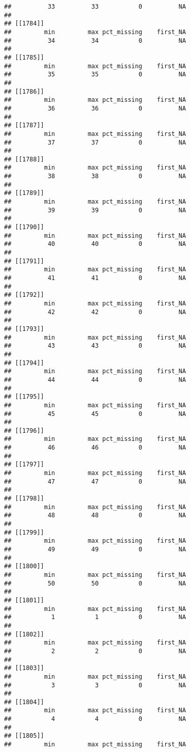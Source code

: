 \documentclass[
]{article}
\begin{document}
\begin{verbatim}
##          33          33           0          NA 
## 
## [[1784]]
##         min         max pct_missing    first_NA 
##          34          34           0          NA 
## 
## [[1785]]
##         min         max pct_missing    first_NA 
##          35          35           0          NA 
## 
## [[1786]]
##         min         max pct_missing    first_NA 
##          36          36           0          NA 
## 
## [[1787]]
##         min         max pct_missing    first_NA 
##          37          37           0          NA 
## 
## [[1788]]
##         min         max pct_missing    first_NA 
##          38          38           0          NA 
## 
## [[1789]]
##         min         max pct_missing    first_NA 
##          39          39           0          NA 
## 
## [[1790]]
##         min         max pct_missing    first_NA 
##          40          40           0          NA 
## 
## [[1791]]
##         min         max pct_missing    first_NA 
##          41          41           0          NA 
## 
## [[1792]]
##         min         max pct_missing    first_NA 
##          42          42           0          NA 
## 
## [[1793]]
##         min         max pct_missing    first_NA 
##          43          43           0          NA 
## 
## [[1794]]
##         min         max pct_missing    first_NA 
##          44          44           0          NA 
## 
## [[1795]]
##         min         max pct_missing    first_NA 
##          45          45           0          NA 
## 
## [[1796]]
##         min         max pct_missing    first_NA 
##          46          46           0          NA 
## 
## [[1797]]
##         min         max pct_missing    first_NA 
##          47          47           0          NA 
## 
## [[1798]]
##         min         max pct_missing    first_NA 
##          48          48           0          NA 
## 
## [[1799]]
##         min         max pct_missing    first_NA 
##          49          49           0          NA 
## 
## [[1800]]
##         min         max pct_missing    first_NA 
##          50          50           0          NA 
## 
## [[1801]]
##         min         max pct_missing    first_NA 
##           1           1           0          NA 
## 
## [[1802]]
##         min         max pct_missing    first_NA 
##           2           2           0          NA 
## 
## [[1803]]
##         min         max pct_missing    first_NA 
##           3           3           0          NA 
## 
## [[1804]]
##         min         max pct_missing    first_NA 
##           4           4           0          NA 
## 
## [[1805]]
##         min         max pct_missing    first_NA 

\end{verbatim}
\end{document}
